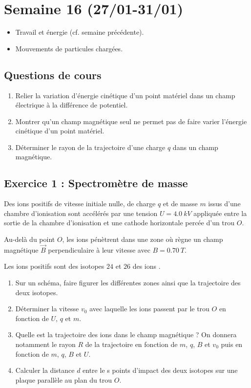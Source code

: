 \section{Semaine 16 (27/01-31/01) }


\begin{itemize}
	\item Travail et énergie (cf. semaine précédente).
	\item Mouvements de particules chargées.
\end{itemize}

\subsection{Questions de cours}

\begin{enumerate}
	\item Relier la variation d'énergie cinétique d'un point matériel dans un champ électrique à la différence de potentiel.
	
	\item Montrer qu'un champ magnétique seul ne permet pas de faire varier l'énergie cinétique d'un point matériel.
	
	\item Déterminer le rayon de la trajectoire d'une charge $q$ dans un champ magnétique.
\end{enumerate}

\subsection{Exercice 1 : Spectromètre de masse}

Des ions positifs de vitesse initiale nulle, de charge $q$ et de masse $m$ issus d'une chambre d'ionisation sont accélérés par une tension $U = \SI{4.0}{kV}$ appliquée entre la sortie de la chambre d'ionisation et une cathode horizontale percée d'un trou $O$.

Au-delà du point $O$, les ions pénètrent dans une zone où règne un champ magnétique $\vec{B}$ perpendiculaire à leur vitesse avec $B = \SI{0.70}{T}$. 

Les ions positifs sont des isotopes $24$ et $26$ des ions .

\begin{enumerate}
	\item Sur un schéma, faire figurer les différentes zones ainsi que la trajectoire des deux isotopes.
	\item Déterminer la vitesse $v_0$ avec laquelle les ions passent par le trou $O$ en fonction de $U$, $q$ et $m$. 
	\item Quelle est la trajectoire des ions dans le champ magnétique ? On donnera notamment le rayon $R$ de la trajectoire en fonction de $m$, $q$, $B$ et $v_0$ puis en fonction de $m$, $q$, $B$ et $U$.
	\item Calculer la distance $d$ entre le s points d'impact des deux isotopes sur une plaque parallèle au plan du trou $O$.
\end{enumerate}

